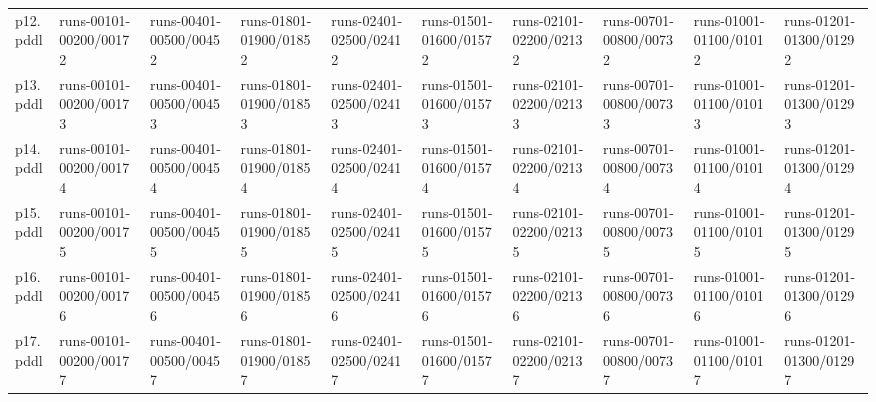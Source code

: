 \documentclass{article}
\begin{document}
\begin{tabular}{@{}lrrrrrrrrr@{}}
p12.pddl & \multicolumn{1}{|l|}{runs-00101-00200/00172} & \multicolumn{1}{|l|}{runs-00401-00500/00452} & \multicolumn{1}{|l|}{runs-01801-01900/01852} & \multicolumn{1}{|l|}{runs-02401-02500/02412} & \multicolumn{1}{|l|}{runs-01501-01600/01572} & \multicolumn{1}{|l|}{runs-02101-02200/02132} & \multicolumn{1}{|l|}{runs-00701-00800/00732} & \multicolumn{1}{|l|}{runs-01001-01100/01012} & \multicolumn{1}{|l|}{runs-01201-01300/01292} \\
p13.pddl & \multicolumn{1}{|l|}{runs-00101-00200/00173} & \multicolumn{1}{|l|}{runs-00401-00500/00453} & \multicolumn{1}{|l|}{runs-01801-01900/01853} & \multicolumn{1}{|l|}{runs-02401-02500/02413} & \multicolumn{1}{|l|}{runs-01501-01600/01573} & \multicolumn{1}{|l|}{runs-02101-02200/02133} & \multicolumn{1}{|l|}{runs-00701-00800/00733} & \multicolumn{1}{|l|}{runs-01001-01100/01013} & \multicolumn{1}{|l|}{runs-01201-01300/01293} \\
p14.pddl & \multicolumn{1}{|l|}{runs-00101-00200/00174} & \multicolumn{1}{|l|}{runs-00401-00500/00454} & \multicolumn{1}{|l|}{runs-01801-01900/01854} & \multicolumn{1}{|l|}{runs-02401-02500/02414} & \multicolumn{1}{|l|}{runs-01501-01600/01574} & \multicolumn{1}{|l|}{runs-02101-02200/02134} & \multicolumn{1}{|l|}{runs-00701-00800/00734} & \multicolumn{1}{|l|}{runs-01001-01100/01014} & \multicolumn{1}{|l|}{runs-01201-01300/01294} \\
p15.pddl & \multicolumn{1}{|l|}{runs-00101-00200/00175} & \multicolumn{1}{|l|}{runs-00401-00500/00455} & \multicolumn{1}{|l|}{runs-01801-01900/01855} & \multicolumn{1}{|l|}{runs-02401-02500/02415} & \multicolumn{1}{|l|}{runs-01501-01600/01575} & \multicolumn{1}{|l|}{runs-02101-02200/02135} & \multicolumn{1}{|l|}{runs-00701-00800/00735} & \multicolumn{1}{|l|}{runs-01001-01100/01015} & \multicolumn{1}{|l|}{runs-01201-01300/01295} \\
p16.pddl & \multicolumn{1}{|l|}{runs-00101-00200/00176} & \multicolumn{1}{|l|}{runs-00401-00500/00456} & \multicolumn{1}{|l|}{runs-01801-01900/01856} & \multicolumn{1}{|l|}{runs-02401-02500/02416} & \multicolumn{1}{|l|}{runs-01501-01600/01576} & \multicolumn{1}{|l|}{runs-02101-02200/02136} & \multicolumn{1}{|l|}{runs-00701-00800/00736} & \multicolumn{1}{|l|}{runs-01001-01100/01016} & \multicolumn{1}{|l|}{runs-01201-01300/01296} \\
p17.pddl & \multicolumn{1}{|l|}{runs-00101-00200/00177} & \multicolumn{1}{|l|}{runs-00401-00500/00457} & \multicolumn{1}{|l|}{runs-01801-01900/01857} & \multicolumn{1}{|l|}{runs-02401-02500/02417} & \multicolumn{1}{|l|}{runs-01501-01600/01577} & \multicolumn{1}{|l|}{runs-02101-02200/02137} & \multicolumn{1}{|l|}{runs-00701-00800/00737} & \multicolumn{1}{|l|}{runs-01001-01100/01017} & \multicolumn{1}{|l|}{runs-01201-01300/01297} \\

\end{tabular}
\end{document}

